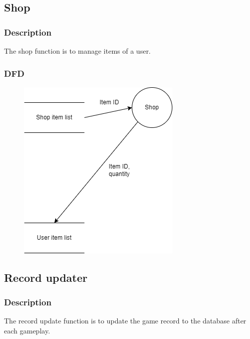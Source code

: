 \documentclass{article}
\begin{document}
\subsection{Shop}
\subsubsection{Description}
\par The shop function is to manage items of a user.
\subsubsection{DFD}
\begin{figure}[H]
    \centering
    \includegraphics*[scale=0.4]{Shop_DFD.png}
\end{figure}
\subsection{Record updater}
\subsubsection{Description}
\par The record update function is to update the game record to the database after each gameplay.
\end{document}
